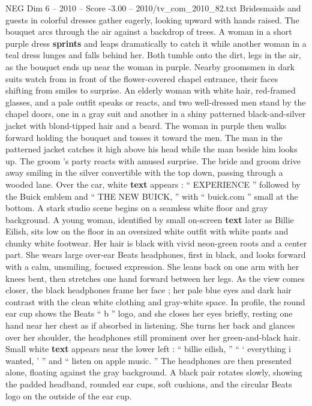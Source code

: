 \begin{textsample}{NEG Dim 6 – 2010 – Score -3.00 – 2010/tv\_com\_2010\_82.txt}
Bridesmaids and guests in colorful dresses gather eagerly, looking upward with hands raised.
The bouquet arcs through the air against a backdrop of trees.
A woman in a short purple dress \textbf{sprints} and leaps dramatically to catch it while another woman in a teal dress lunges and falls behind her.
Both tumble onto the dirt, legs in the air, as the bouquet ends up near the woman in purple.
Nearby groomsmen in dark suits watch from in front of the flower-covered chapel entrance, their faces shifting from smiles to surprise.
An elderly woman with white hair, red-framed glasses, and a pale outfit speaks or reacts, and two well-dressed men stand by the chapel doors, one in a gray suit and another in a shiny patterned black-and-silver jacket with blond-tipped hair and a beard.
The woman in purple then walks forward holding the bouquet and tosses it toward the men.
The man in the patterned jacket catches it high above his head while the man beside him looks up.
The groom ’s party reacts with amused surprise.
The bride and groom drive away smiling in the silver convertible with the top down, passing through a wooded lane.
Over the car, white \textbf{text} appears : “ EXPERIENCE ” followed by the Buick emblem and “ THE NEW BUICK, ” with “ buick.com ” small at the bottom.
A stark studio scene begins on a seamless white floor and gray background.
A young woman, identified by small on-screen \textbf{text} later as Billie Eilish, sits low on the floor in an oversized white outfit with white pants and chunky white footwear.
Her hair is black with vivid neon-green roots and a center part.
She wears large over-ear Beats headphones, first in black, and looks forward with a calm, unsmiling, focused expression.
She leans back on one arm with her knees bent, then stretches one hand forward between her legs.
As the view comes closer, the black headphones frame her face ; her pale blue eyes and dark hair contrast with the clean white clothing and gray-white space.
In profile, the round ear cup shows the Beats “ b ” logo, and she closes her eyes briefly, resting one hand near her chest as if absorbed in listening.
She turns her back and glances over her shoulder, the headphones still prominent over her green-and-black hair.
Small white \textbf{text} appears near the lower left : “ billie eilish, ” “ ‘ everything i wanted, ’ ” and “ listen on apple music. ” The headphones are then presented alone, floating against the gray background.
A black pair rotates slowly, showing the padded headband, rounded ear cups, soft cushions, and the circular Beats logo on the outside of the ear cup.

\end{textsample}

